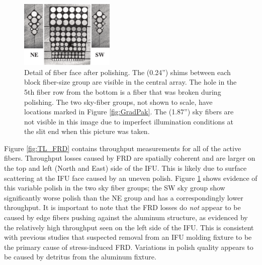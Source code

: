 \begin{appendices}
\begin{figure}
  \centering
  \includegraphics[width=0.4\textwidth]{891_1/figs/gradpak_facefig.pdf}
  \caption{\label{fig:gradpak_face}\fixspacing Detail of \GP fiber face
    after polishing. The  (0.24'') shims between each
    block fiber-size group are visible in the central array. The hole
    in the 5th fiber row from the bottom is a fiber that was broken
    during polishing. The two sky-fiber groups, not shown to scale,
    have locations marked in Figure \ref{fig:GradPak}.  The
     (1.87'') sky fibers are not visible in this image
    due to imperfect illumination conditions at the slit end when this
    picture was taken.}
\end{figure}

Figure \ref{fig:TL_FRD} contains throughput measurements for all of
the active \GP fibers. Throughput losses caused by FRD are spatially
coherent and are larger on the top and left (North and East) side of
the IFU. This is likely due to surface scattering at the IFU face
\citep{Eigenbrot12} caused by an uneven polish. Figure
\ref{fig:gradpak_face} shows evidence of this variable polish in the
two sky fiber groups; the SW sky group show significantly worse polish
than the NE group and has a correspondingly lower throughput. It is
important to note that the FRD losses do \emph{not} appear to be
caused by edge fibers pushing against the aluminum structure, as
evidenced by the relatively high throughput seen on the left side of
the IFU. This is consistent with previous studies \citep{Bershady04}
that suspected removal from an IFU molding fixture to be the primary
cause of stress-induced FRD. Variations in polish quality appears to
be caused by detritus from the aluminum fixture.


\end{appendices}
